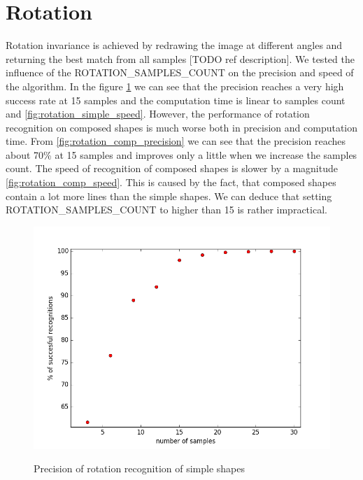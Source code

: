 \section{Rotation}
Rotation invariance is achieved by redrawing the image at different angles and returning the best match from all samples [TODO ref description]. We tested the influence of the ROTATION\_SAMPLES\_COUNT on the precision and speed of the algorithm. In the figure \ref{fig:rotation_simple_precision} we can see that the precision reaches a very high success rate at 15 samples and the computation time is linear to samples count and \ref{fig:rotation_simple_speed}. However, the performance of rotation recognition on composed shapes is much worse both in precision and computation time. From \ref{fig:rotation_comp_precision} we can see that the precision reaches about 70\% at 15 samples and improves only a little when we increase the samples count. The speed of recognition of composed shapes is slower by a magnitude \ref{fig:rotation_comp_speed}. This is caused by the fact, that composed shapes contain a lot more lines than the simple shapes. We can deduce that setting ROTATION\_SAMPLES\_COUNT to higher than 15 is rather impractical.
\begin{figure}[!htb]
\begin{center}
\label{fig:rotation_simple_precision}
\includegraphics[width=\linewidth]{ext/rotation_simple_precision.png}
\end{center}
    \centering
    \caption{Precision of rotation recognition of simple shapes}
\end{figure}

